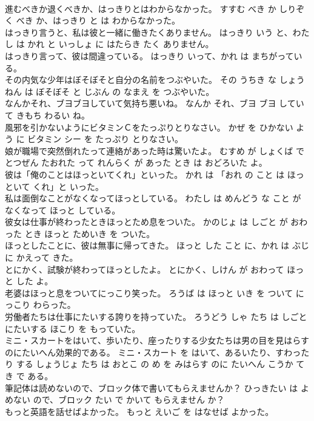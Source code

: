 \documentclass[8pt]{extreport}
\begin{document}
\begin{CJK}{UTF8}{min}
\\	進むべきか退くべきか、はっきりとはわからなかった。	すすむ べき か しりぞく べき か、はっきり と は わからなかった。	
\\	はっきり言うと、私は彼と一緒に働きたくありません。	はっきり いう と、わたし は かれ と いっしょ に はたらき たく ありません。	
\\	はっきり言って、彼は間違っている。	はっきり いって、かれ は まちがっている。	
\\	その内気な少年はぼそぼそと自分の名前をつぶやいた。	その うちき な しょうねん は ぼそぼそ と じぶん の なまえ を つぶやいた。	
\\	なんかそれ、ブヨブヨしていて気持ち悪いね。	なんか それ、ブヨ ブヨ していて きもち わるい ね。	
\\	風邪を引かないようにビタミンＣをたっぷりとりなさい。	かぜ を ひかない よう に ビタミン シー を たっぷり とりなさい。	
\\	娘が職場で突然倒れたって連絡があった時は驚いたよ。	むすめ が しょくば で とつぜん たおれた って れんらく が あった とき は おどろいた よ。	
\\	彼は「俺のことはほっといてくれ」といった。	かれ は 「おれ の こと は ほっといて くれ」と いった。	
\\	私は面倒なことがなくなってほっとしている。	わたし は めんどう な こと が なくなって ほっと している。	
\\	彼女は仕事が終わったときほっとため息をついた。	かのじょ は しごと が おわった とき ほっと ためいき を ついた。	
\\	ほっとしたことに、彼は無事に帰ってきた。	ほっと した こと に、かれ は ぶじ に かえって きた。	
\\	とにかく、試験が終わってほっとしたよ。	とにかく、しけん が おわって ほっと した よ。	
\\	老婆はほっと息をついてにっこり笑った。	ろうば は ほっと いき を ついて にっこり わらった。	
\\	労働者たちは仕事にたいする誇りを持っていた。	ろうどう しゃ たち は しごと にたいする ほこり を もっていた。	
\\	ミニ・スカートをはいて、歩いたり、座ったりする少女たちは男の目を見はらすのにたいへん効果的である。	ミニ・スカート を はいて、あるいたり、すわったり する しょうじょ たち は おとこ の め を みはらす のに たいへん こうか てき で ある。	
\\	筆記体は読めないので、ブロック体で書いてもらえませんか？	ひっきたい は よめない ので、ブロック たい で かいて もらえません か？	
\\	もっと英語を話せばよかった。	もっと えいご を はなせば よかった。	

\end{CJK}
\end{document}
